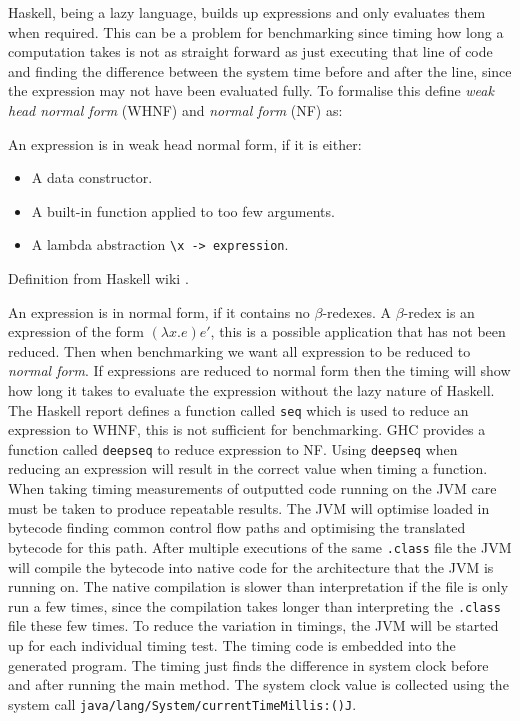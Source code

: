 \documentclass[float=false, crop=false]{standalone}
\begin{document}
Haskell, being a lazy language, builds up expressions and only
evaluates them when required. 
This can be a problem for benchmarking since timing how long a
computation takes is not as straight forward as just executing that line
of code and finding the difference between the system time before and after the line,
since the expression may not have been evaluated fully. 
To formalise this define \textit{weak head normal form} (WHNF) and 
\textit{normal form} (NF) as:
\begin{displayquote}
  An expression is in weak head normal form, if it is either:
  \begin{itemize}
    \item A data constructor.

    \item A built-in function applied to too few arguments.

    \item A lambda abstraction \verb|\x -> expression|.
  \end{itemize}
\end{displayquote}
  \begin{flushright} 
    Definition from Haskell wiki \cite{haskell-whnf}.
  \end{flushright}
    An expression is in normal form, if it contains no $\beta$-redexes. 
    A $\beta$-redex is an expression of the form $(\lambda x.e)e'$, 
    this is a possible application that has not been reduced.
Then when benchmarking we want all expression to be reduced to \textit{normal form}. If expressions
are reduced to normal form then the timing will show how long it takes to evaluate the expression
without the lazy nature of Haskell. 
The Haskell report defines a function called \verb|seq| which is used to 
reduce an expression to WHNF, this is not sufficient for benchmarking. 
GHC provides a function called \verb|deepseq| to reduce expression to NF.
Using \verb|deepseq| when reducing an expression will result in the 
correct value when timing a function.
When taking timing measurements of outputted code running on the JVM care
must be taken to produce repeatable results. The JVM will optimise loaded
in bytecode finding common control flow paths and optimising the translated
bytecode for this path. After multiple executions
of the same \verb|.class| file the JVM will compile the bytecode
into native code for the architecture that the JVM is running on. 
The native compilation is slower than interpretation if the file
is only run a few times, since the compilation takes longer than
interpreting the \verb|.class| file these few times.
To reduce the variation in timings, the JVM will be started up for 
each individual timing test. The timing code is embedded into the
generated program. The timing just finds the difference in 
system clock before and after running the main method. The 
system clock value is collected using the system call
\verb|java/lang/System/currentTimeMillis:()J|.
\end{document}
